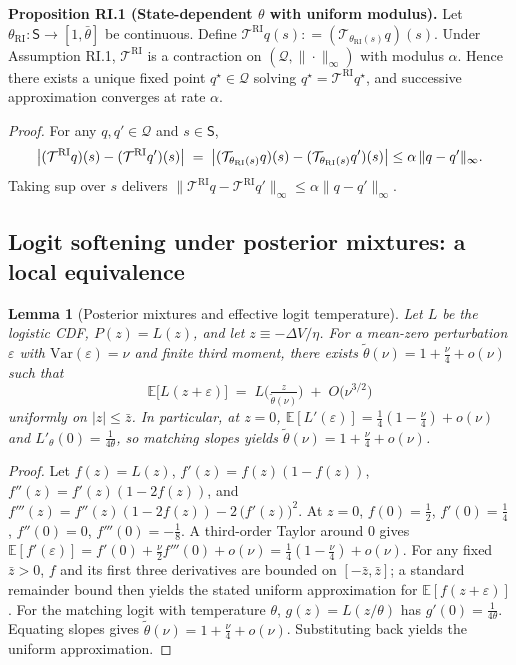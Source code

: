 \documentclass[12pt]{article}
\providecommand{\coloneqq}{\mathrel{\mathop:}=}
\theoremstyle{plain}
\newtheorem{lemma}{Lemma}
\newcommand{\E}{\mathbb{E}}
\newcommand{\Var}{\mathrm{Var}}
\begin{document}
\noindent\textbf{Proposition RI.1 (State-dependent $\theta$ with uniform modulus).} Let $\theta_{\mathrm{RI}}: \mathsf S\to[1,\bar\theta]$ be continuous. Define $\mathcal T^{\mathrm{RI}} q (s) \coloneqq (\mathcal T_{\theta_{\mathrm{RI}}(s)} q)(s)$. Under Assumption RI.1, $\mathcal T^{\mathrm{RI}}$ is a contraction on $(\mathcal Q, \|\cdot\|_\infty)$ with modulus $\alpha$. Hence there exists a unique fixed point $q^\star \in \mathcal Q$ solving $q^\star = \mathcal T^{\mathrm{RI}} q^\star$, and successive approximation converges at rate $\alpha$.

\noindent\textit{Proof.} For any $q,q' \in \mathcal Q$ and $s \in \mathsf S$,
\[ \big| (\mathcal T^{\mathrm{RI}} q)(s) - (\mathcal T^{\mathrm{RI}} q')(s) \big| \;=\; \big| (\mathcal T_{\theta_{\mathrm{RI}}(s)} q)(s) - (\mathcal T_{\theta_{\mathrm{RI}}(s)} q')(s) \big| \\
	\le \alpha \, \| q-q' \|_\infty. \]
Taking sup over $s$ delivers $\| \mathcal T^{\mathrm{RI}} q - \mathcal
	T^{\mathrm{RI}} q' \|_\infty \le \alpha \| q-q' \|_\infty$.

\subsection{Logit softening under posterior mixtures: a local equivalence}\label{app:ri_logit_bridge}

\begin{lemma}[Posterior mixtures and effective logit temperature]
	Let $L$ be the logistic CDF, $P(z)=L(z)$, and let $z\equiv-\Delta V/\eta$. For a
	mean-zero perturbation $\varepsilon$ with $\Var(\varepsilon)=\nu$ and finite
	third moment, there exists $\tilde\theta(\nu)=1+\tfrac{\nu}{4}+o(\nu)$ such
	that
	\[
		\E\big[L(z+\varepsilon)\big] \;=\; L\!\Big(\tfrac{z}{\tilde\theta(\nu)}\Big)\; +\; O\big(\nu^{3/2}\big)
	\]
	uniformly on $|z|\le\bar z$. In particular, at $z=0$,
	\(\E[L'(\varepsilon)]=\tfrac{1}{4}(1-\tfrac{\nu}{4})+o(\nu)\) and
	\(L'_\theta(0)=\tfrac{1}{4\theta}\), so matching slopes yields
	\(\tilde\theta(\nu)=1+\tfrac{\nu}{4}+o(\nu)\).
\end{lemma}

\begin{proof}
	Let $f(z)=L(z)$, $f'(z)=f(z)(1-f(z))$, $f''(z)=f'(z)(1-2f(z))$, and
	$f'''(z)=f''(z)(1-2f(z)) - 2\,\big(f'(z)\big)^2$. At $z=0$, $f(0)=\tfrac12$,
	$f'(0)=\tfrac14$, $f''(0)=0$, $f'''(0)=-\tfrac18$. A third-order Taylor around
	0 gives $\E[f'(\varepsilon)]=f'(0)+\tfrac{\nu}{2}f'''(0)+o(\nu)=\tfrac14(1-\tfrac{\nu}{4})+o(\nu)$.
	For any fixed $\bar z>0$, $f$ and its first three derivatives are bounded on
	$[-\bar z,\bar z]$; a standard remainder bound then yields the stated uniform
	approximation for $\E[f(z+\varepsilon)]$. For the matching logit with
	temperature $\theta$, $g(z)=L(z/\theta)$ has $g'(0)=\tfrac{1}{4\theta}$.
	Equating slopes gives $\tilde\theta(\nu)=1+\tfrac{\nu}{4}+o(\nu)$. Substituting
	back yields the uniform approximation.
\end{proof}
\end{document}
